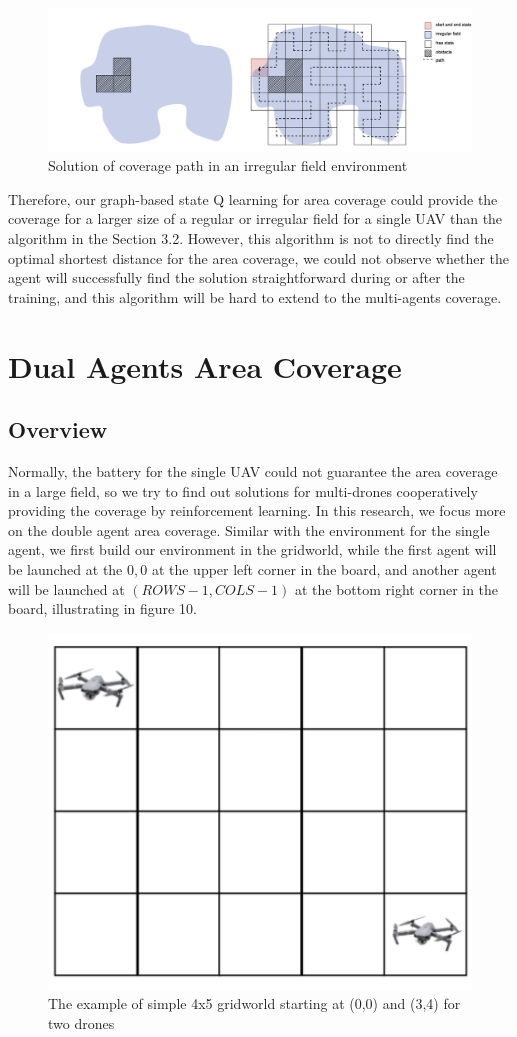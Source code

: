 \documentclass{article}
\begin{document}
\begin{figure}[H]
     \centering
     \includegraphics[width=.9\textwidth]{10.png}
     \caption{Solution of coverage path in an irregular field environment}
\end{figure}

Therefore, our graph-based state Q learning for area coverage could provide the coverage for a larger size of a regular or irregular field for a single UAV than the algorithm in the Section 3.2. However, this algorithm is not to directly find the optimal shortest distance for the area coverage, we could not observe whether the agent will successfully find the solution straightforward during or after the training, and this algorithm will be hard to extend to the multi-agents coverage. 

\newpage

\section{Dual Agents Area Coverage}

\subsection{Overview}
\hspace{\parindent} Normally, the battery for the single UAV could not guarantee the area coverage in a large field, so we try to find out solutions for multi-drones cooperatively providing the coverage by reinforcement learning. In this research, we focus more on the double agent area coverage. Similar with the environment for the single agent, we first build our environment in the gridworld, while the first agent will be launched at the $0,0$ at the upper left corner in the board, and another agent will be launched at $(ROWS-1, COLS-1)$ at the bottom right corner in the board, illustrating in figure 10.

\begin{figure}[H]
     \centering
     \includegraphics[width=.25\textwidth]{19.png}
     \caption{The example of simple 4x5 gridworld starting at (0,0) and (3,4) for two drones}
\end{figure}
\end{document}
